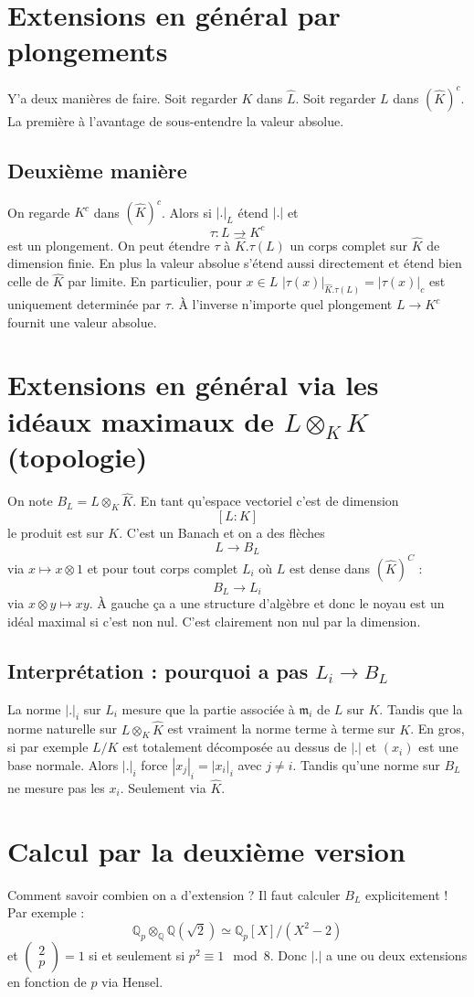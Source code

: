 \documentclass[a4paper,12pt]{book}
\newcommand{\Q}{\mathbb{Q}}
\newcommand{\m}{\mathfrak m}
\theoremstyle{plain}
\theoremstyle{definition}
\theoremstyle{remark}
\begin{document}
\section{Extensions en général par plongements}

Y'a deux manières de faire. Soit regarder
$K$ dans $\hat L$. Soit regarder $L$ dans
$(\hat K)^c$. La première à l'avantage de 
sous-entendre la valeur absolue.
\subsection{Deuxième manière}
On regarde $K^c$ dans $(\hat K)^c$.
Alors si $|.|_L$ étend $|.|$ et
\[\tau \colon L\to K^c\] est un plongement.
On peut étendre $\tau$ à $\hat K.\tau(L)$ un
corps complet sur $\hat K$ de dimension finie.
En plus la valeur absolue s'étend aussi 
directement et étend bien celle de $\hat K$
par limite. En particulier, pour $x\in L$
$|\tau(x)|_{\hat K.\tau(L)}=|\tau(x)|_c$ est
uniquement determinée par $\tau$. À l'inverse
n'importe quel plongement $L\to K^c$ fournit
une valeur absolue.

\section{Extensions en général via les idéaux
maximaux de $L\otimes_K\hat K$ (topologie)}
On note $B_L=L\otimes_K \hat K$. En tant qu'espace
vectoriel c'est de dimension 
\[[L:K]\]
le produit est sur $K$. C'est un Banach et on a 
des flèches
\[L\to B_L\]
via $x\mapsto x\otimes 1$ et pour tout corps complet
$L_i$ où $L$ est dense dans 
$(\hat K)^C$ :
\[B_L\to L_i\]
via $x\otimes y\mapsto xy$. À gauche ça a une structure
d'algèbre et donc le noyau est un idéal maximal si c'est
non nul. C'est clairement non nul par la dimension.

\subsection{Interprétation : pourquoi a pas $L_i\to B_L$}
La norme $|.|_i$ sur $L_i$ mesure que la partie associée
à $\m_i$ de $L$ sur $K$. Tandis que la norme naturelle sur
$L\otimes_K \hat K$ est vraiment la norme terme à terme
sur $K$. En gros, si par exemple $L/K$ est totalement
décomposée au dessus de $|.|$ et $(x_i)$ est une base
normale. Alors $|.|_i$ force $|x_j|_i=|x_i|_i$ avec $j\ne i$.
Tandis qu'une norme sur $B_L$ ne mesure pas les $x_i$. 
Seulement via $\hat K$.



\section{Calcul par la deuxième version}
Comment savoir combien on a d'extension ? Il faut calculer
$B_L$ explicitement ! Par exemple :
\[\Q_p\otimes_\Q \Q(\sqrt 2)\simeq \Q_p[X]/(X^2-2)\]
et $\begin{pmatrix} 2\\ p\end{pmatrix}=1 $ si et 
seulement si $p^2\equiv 1\mod 8$. Donc $|.|$ a une
ou deux extensions en fonction de $p$ via Hensel.
\end{document}
